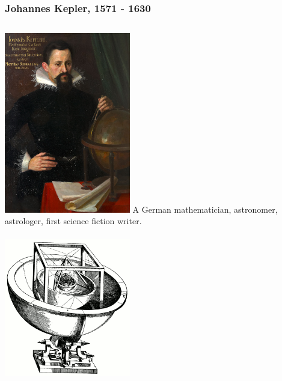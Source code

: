 \documentclass[aspectratio=169,xcolor=pdftex,dvipsnames]{beamer} %
\begin{document}
\begin{frame}
\frametitle{Johannes Kepler, 1571 - 1630}

\begin{columns}
        
      \includegraphics[width=55mm]{kepler.jpg}
          A German mathematician, astronomer, astrologer, first science fiction writer.
          \\ \ \\
          \includegraphics[width=55mm]{keplerSolarSystem.png}
\end{columns} 

\end{frame}
\end{document}
